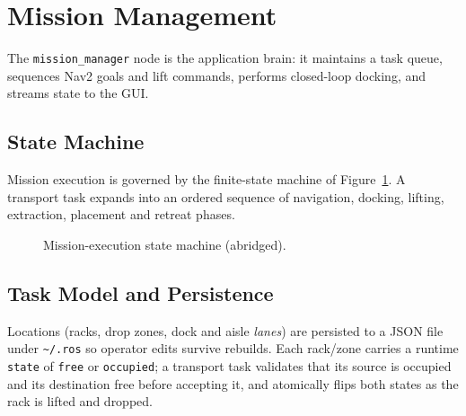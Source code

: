 \documentclass[11pt,a4paper]{article}
\newcommand{\code}[1]{\texttt{\small #1}}
\begin{document}
\section{Mission Management}\label{sec:mission}
The \code{mission\_manager} node is the application brain: it maintains a task
queue, sequences Nav2 goals and lift commands, performs closed-loop docking,
and streams state to the GUI.

\subsection{State Machine}
Mission execution is governed by the finite-state machine of
Figure~\ref{fig:fsm}. A transport task expands into an ordered sequence of
navigation, docking, lifting, extraction, placement and retreat phases.

\begin{figure}[h]\centering
{}
\caption{Mission-execution state machine (abridged).}\label{fig:fsm}
\end{figure}

\subsection{Task Model and Persistence}
Locations (racks, drop zones, dock and aisle \emph{lanes}) are persisted to a
JSON file under \code{\textasciitilde/.ros} so operator edits survive
rebuilds. Each rack/zone carries a runtime \code{state} of \code{free} or
\code{occupied}; a transport task validates that its source is occupied and
its destination free before accepting it, and atomically flips both states as
the rack is lifted and dropped.
\end{document}
